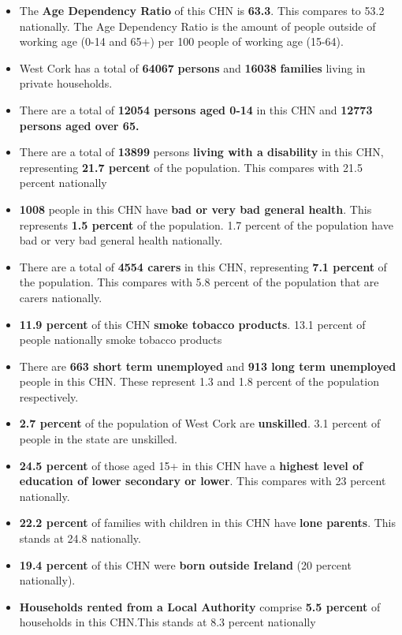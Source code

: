 \documentclass{article}
\begin{document}
\begin{itemize}

\item The \textbf{Age Dependency Ratio} of this CHN is  \textbf{63.3}. This compares to 53.2 nationally. The Age Dependency Ratio is the amount of people outside of working age (0-14 and 65+) per 100 people of working age (15-64). 

\item West Cork has a total of \textbf{\num{64067}} \textbf{persons} and  \textbf{\num{16038}} \textbf{families} living in private households.

\item There are a total of \textbf{\num{12054} persons aged 0-14} in this CHN and \textbf{\num{12773} persons aged over 65.} 

\item There are a total of \textbf{\num{13899}} persons \textbf{living with a disability} in this CHN, representing \textbf{21.7 percent} of the population. This compares with  21.5 percent nationally

\item \textbf{\num{1008}} people in this CHN have \textbf{bad or very bad general health}. This represents \textbf{1.5 percent} of the population. 1.7 percent of the population have bad or very bad general health nationally. 

\item There are a total of \textbf{\num{4554} carers} in this CHN, representing \textbf{7.1 percent} of the population. This compares with 5.8 percent of the population that are carers nationally. 

\item \textbf{11.9 percent} of this CHN \textbf{smoke tobacco products}. 13.1 percent of people nationally smoke tobacco products

\item There are \textbf{\num{663} short term unemployed} and \textbf{\num{913} long term unemployed} people in this CHN. These represent 1.3 and 1.8 percent of the population respectively.

\item  \textbf{2.7 percent} of the population of West Cork are \textbf{unskilled}. 3.1 percent of people in the state are unskilled.

\item \textbf{24.5 percent} of those aged 15+ in this CHN have a \textbf{highest level of education of lower secondary or lower}. This compares with 23 percent nationally. 

\item \textbf{22.2 percent} of families with children in this CHN have \textbf{lone parents}. This stands at 24.8 nationally.

\item \textbf{19.4 percent} of this CHN were \textbf{born outside Ireland} (20 percent nationally).

\item \textbf{Households rented from a Local Authority} comprise \textbf{5.5 percent} of households in this CHN.This stands at 8.3 percent nationally

\end{itemize}
\end{document}
